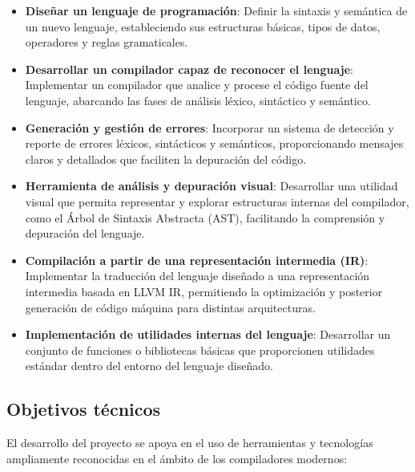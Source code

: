
\begin{itemize}
    \item \textbf{Diseñar un lenguaje de programación}: 
    Definir la sintaxis y semántica de un nuevo lenguaje, estableciendo sus estructuras básicas, tipos de datos, operadores y reglas gramaticales.

    \item \textbf{Desarrollar un compilador capaz de reconocer el lenguaje}: 
    Implementar un compilador que analice y procese el código fuente del lenguaje, abarcando las fases de análisis léxico, sintáctico y semántico.

    \item \textbf{Generación y gestión de errores}: 
    Incorporar un sistema de detección y reporte de errores léxicos, sintácticos y semánticos, proporcionando mensajes claros y detallados que faciliten la depuración del código.

    \item \textbf{Herramienta de análisis y depuración visual}: 
    Desarrollar una utilidad visual que permita representar y explorar estructuras internas del compilador, como el Árbol de Sintaxis Abstracta (AST), facilitando la comprensión y depuración del lenguaje.

    \item \textbf{Compilación a partir de una representación intermedia (IR)}: 
    Implementar la traducción del lenguaje diseñado a una representación intermedia basada en LLVM IR, permitiendo la optimización y posterior generación de código máquina para distintas arquitecturas.

    \item \textbf{Implementación de utilidades internas del lenguaje}: 
    Desarrollar un conjunto de funciones o bibliotecas básicas que proporcionen utilidades estándar dentro del entorno del lenguaje diseñado.
\end{itemize}

\subsection{Objetivos técnicos}

El desarrollo del proyecto se apoya en el uso de herramientas y tecnologías ampliamente reconocidas en el ámbito de los compiladores modernos:

